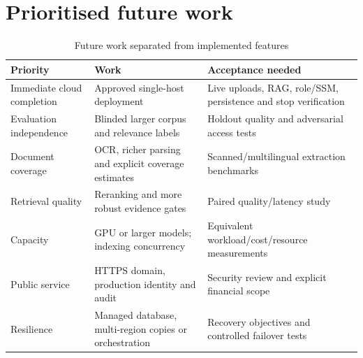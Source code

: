 \section{Prioritised future work}
\par\begin{table}[htbp]\caption{Future work separated from implemented features}\small\begin{tabularx}{\linewidth}{p{.28\linewidth}YY}\toprule Priority&Work&Acceptance needed\\\midrule
Immediate cloud completion&Approved single-host deployment&Live uploads, RAG, role/SSM, persistence and stop verification\\
Evaluation independence&Blinded larger corpus and relevance labels&Holdout quality and adversarial access tests\\
Document coverage&OCR, richer parsing and explicit coverage estimates&Scanned/multilingual extraction benchmarks\\
Retrieval quality&Reranking and more robust evidence gates&Paired quality/latency study\\
Capacity&GPU or larger models; indexing concurrency&Equivalent workload/cost/resource measurements\\
Public service&HTTPS domain, production identity and audit&Security review and explicit financial scope\\
Resilience&Managed database, multi-region copies or orchestration&Recovery objectives and controlled failover tests\\\bottomrule\end{tabularx}\end{table}\par
\FloatBarrier
